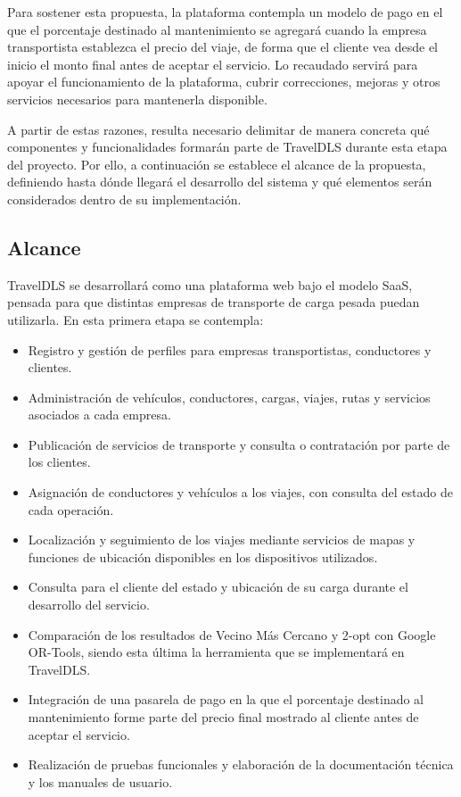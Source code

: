 Para sostener esta propuesta, la plataforma contempla un modelo de pago en el que el porcentaje destinado al mantenimiento se agregará cuando la empresa transportista establezca el precio del viaje, de forma que el cliente vea desde el inicio el monto final antes de aceptar el servicio. Lo recaudado servirá para apoyar el funcionamiento de la plataforma, cubrir correcciones, mejoras y otros servicios necesarios para mantenerla disponible.

A partir de estas razones, resulta necesario delimitar de manera concreta qué componentes y funcionalidades formarán parte de TravelDLS durante esta etapa del proyecto. Por ello, a continuación se establece el alcance de la propuesta, definiendo hasta dónde llegará el desarrollo del sistema y qué elementos serán considerados dentro de su implementación.

\subsection{Alcance}
\label{sec:alcance}

TravelDLS se desarrollará como una plataforma web bajo el modelo SaaS, pensada para que distintas empresas de transporte de carga pesada puedan utilizarla. En esta primera etapa se contempla:

\begin{itemize}
	\item Registro y gestión de perfiles para empresas transportistas, conductores y clientes.
	\item Administración de vehículos, conductores, cargas, viajes, rutas y servicios asociados a cada empresa.
	\item Publicación de servicios de transporte y consulta o contratación por parte de los clientes.
	\item Asignación de conductores y vehículos a los viajes, con consulta del estado de cada operación.
	\item Localización y seguimiento de los viajes mediante servicios de mapas y funciones de ubicación disponibles en los dispositivos utilizados.
	\item Consulta para el cliente del estado y ubicación de su carga durante el desarrollo del servicio.
	\item Comparación de los resultados de Vecino Más Cercano y 2-opt con Google OR-Tools, siendo esta última la herramienta que se implementará en TravelDLS.
	\item Integración de una pasarela de pago en la que el porcentaje destinado al mantenimiento forme parte del precio final mostrado al cliente antes de aceptar el servicio.
	\item Realización de pruebas funcionales y elaboración de la documentación técnica y los manuales de usuario.
\end{itemize}

